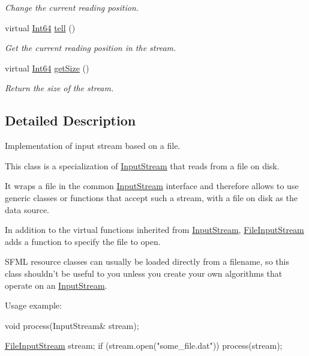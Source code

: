 \begin{DoxyCompactItemize}
\begin{DoxyCompactList}\small\item\em Change the current reading position. \end{DoxyCompactList}\item 
virtual \hyperlink{namespacesf_a2840579fed3494d9f330baf7a5a19903}{Int64} \hyperlink{classsf_1_1_file_input_stream_a768c5fdb3be79e2d71d1bce911f8741c}{tell} ()
\begin{DoxyCompactList}\small\item\em Get the current reading position in the stream. \end{DoxyCompactList}\item 
virtual \hyperlink{namespacesf_a2840579fed3494d9f330baf7a5a19903}{Int64} \hyperlink{classsf_1_1_file_input_stream_aabdcaa315e088e008eeb9711ecc796e8}{get\-Size} ()
\begin{DoxyCompactList}\small\item\em Return the size of the stream. \end{DoxyCompactList}\end{DoxyCompactItemize}


\subsection{Detailed Description}
Implementation of input stream based on a file. 

This class is a specialization of \hyperlink{classsf_1_1_input_stream}{Input\-Stream} that reads from a file on disk.

It wraps a file in the common \hyperlink{classsf_1_1_input_stream}{Input\-Stream} interface and therefore allows to use generic classes or functions that accept such a stream, with a file on disk as the data source.

In addition to the virtual functions inherited from \hyperlink{classsf_1_1_input_stream}{Input\-Stream}, \hyperlink{classsf_1_1_file_input_stream}{File\-Input\-Stream} adds a function to specify the file to open.

S\-F\-M\-L resource classes can usually be loaded directly from a filename, so this class shouldn't be useful to you unless you create your own algorithms that operate on an \hyperlink{classsf_1_1_input_stream}{Input\-Stream}.

Usage example\-: 
\begin{DoxyCode}
\textcolor{keywordtype}{void} process(InputStream& stream);

\hyperlink{class_file_input_stream}{FileInputStream} stream;
\textcolor{keywordflow}{if} (stream.open(\textcolor{stringliteral}{"some\_file.dat"}))
   process(stream);
\end{DoxyCode}


